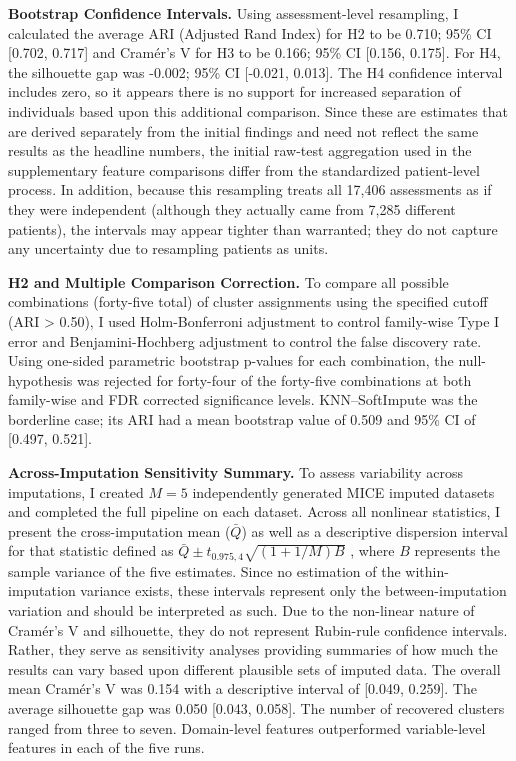 \textbf{Bootstrap Confidence Intervals.} Using assessment-level resampling, I calculated the average ARI (Adjusted Rand Index) for H2 to be 0.710; 95\% CI [0.702, 0.717] and Cramér's V for H3 to be 0.166; 95\% CI [0.156, 0.175]. For H4, the silhouette gap was -0.002; 95\% CI [-0.021, 0.013]. The H4 confidence interval includes zero, so it appears there is no support for increased separation of individuals based upon this additional comparison. Since these are estimates that are derived separately from the initial findings and need not reflect the same results as the headline numbers, the initial raw-test aggregation used in the supplementary feature comparisons differ from the standardized patient-level process. In addition, because this resampling treats all 17,406 assessments as if they were independent (although they actually came from 7,285 different patients), the intervals may appear tighter than warranted; they do not capture any uncertainty due to resampling patients as units.

\textbf{H2 and Multiple Comparison Correction.} To compare all possible combinations (forty-five total) of cluster assignments using the specified cutoff (ARI > 0.50), I used Holm-Bonferroni adjustment to control family-wise Type I error and Benjamini-Hochberg adjustment to control the false discovery rate. Using one-sided parametric bootstrap p-values for each combination, the null-hypothesis was rejected for forty-four of the forty-five combinations at both family-wise and FDR corrected significance levels. KNN--SoftImpute was the borderline case; its ARI had a mean bootstrap value of 0.509 and 95\% CI of [0.497, 0.521].

\textbf{Across-Imputation Sensitivity Summary.} To assess variability across imputations, I created \(M = 5\) independently generated MICE imputed datasets and completed the full pipeline on each dataset. Across all nonlinear statistics, I present the cross-imputation mean (\(\bar{Q}\)) as well as a descriptive dispersion interval for that statistic defined as \(\bar{Q} \pm t_{0.975,4}\sqrt{(1+1/M)B}\) , where \(B\) represents the sample variance of the five estimates. Since no estimation of the within-imputation variance exists, these intervals represent only the between-imputation variation and should be interpreted as such. Due to the non-linear nature of Cramér's V and silhouette, they do not represent Rubin-rule confidence intervals. Rather, they serve as sensitivity analyses providing summaries of how much the results can vary based upon different plausible sets of imputed data. The overall mean Cramér's V was 0.154 with a descriptive interval of [0.049, 0.259]. The average silhouette gap was 0.050 [0.043, 0.058]. The number of recovered clusters ranged from three to seven. Domain-level features outperformed variable-level features in each of the five runs.


